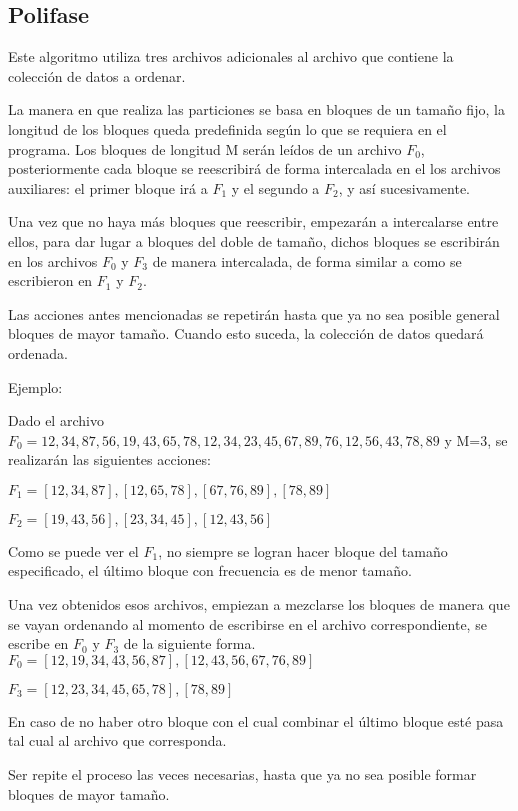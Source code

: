 \documentclass[letterpaper,12pt]{extarticle}
\begin{document}
\subsection{Polifase}

Este algoritmo utiliza tres archivos adicionales al archivo que contiene la colección de datos a ordenar.

La manera en que realiza las particiones se basa en bloques de un tamaño fijo, la longitud de los bloques queda predefinida según lo que se requiera en el programa. Los bloques de longitud M serán leídos de un archivo $F_{0}$, posteriormente cada bloque se reescribirá de forma intercalada en el los archivos auxiliares:  el primer bloque irá a $F_{1}$ y el segundo a $F_{2}$, y así sucesivamente.

Una vez que no haya más bloques que reescribir, empezarán a intercalarse entre ellos, para dar lugar a bloques del doble de tamaño, dichos bloques se escribirán en los archivos $F_{0}$ y $F_{3}$ de manera intercalada, de forma similar a como se escribieron en $F_{1}$ y $F_{2}$.

Las acciones antes mencionadas se repetirán hasta que ya no sea posible general bloques de mayor tamaño. Cuando esto suceda, la colección de datos quedará ordenada.

Ejemplo:

Dado el archivo $F_{0}= {12,34,87,56,19,43,65,78,12,34,23,45,67,89,76,12,56,43,78,89}$ y M=3, se realizarán las siguientes acciones:

$F_{1} = { [12,34,87], [12,65,78], [67,76,89], [78,89] }$

$F_{2} = { [19,43,56], [23,34,45], [12,43,56] }$

Como se puede ver el $F_{1}$, no siempre se logran hacer bloque del tamaño especificado, el último bloque con frecuencia es de menor tamaño.

Una vez obtenidos esos archivos, empiezan a mezclarse los bloques de manera que se vayan ordenando al momento de escribirse en el archivo correspondiente, se escribe en $F_{0}$ y $F_{3}$ de la siguiente forma.
$F_{0} = { [ 12,19,34,43,56,87 ], [ 12,43,56,67,76,89 ]}$

$F_{3} = {[ 12,23,34,45,65,78 ], [ 78,89 ] }$

En caso de no haber otro bloque con el cual combinar el último bloque esté pasa tal cual al archivo que corresponda.

Ser repite el proceso las veces necesarias, hasta que ya no sea posible formar bloques de mayor tamaño.
\end{document}

